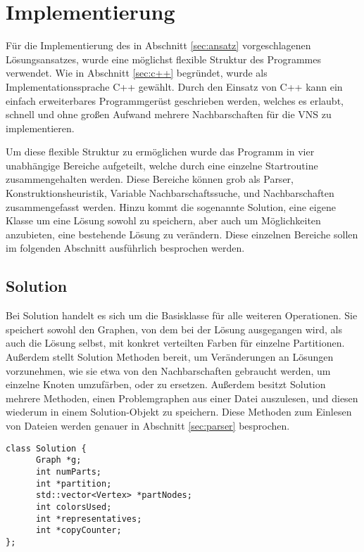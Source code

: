 \section{Implementierung}
Für die Implementierung des in Abschnitt \ref{sec:ansatz} vorgeschlagenen Lösungsansatzes, wurde eine möglichst flexible Struktur des Programmes verwendet. Wie in Abschnitt \ref{sec:c++} begründet, wurde
als Implementationssprache C++ gewählt. Durch den Einsatz von C++ kann ein einfach erweiterbares Programmgerüst geschrieben werden, welches es erlaubt, schnell und ohne großen Aufwand mehrere Nachbarschaften
für die VNS zu implementieren. 

Um diese flexible Struktur zu ermöglichen wurde das Programm in vier unabhängige Bereiche aufgeteilt, welche durch eine einzelne Startroutine zusammengehalten werden. Diese Bereiche können grob als Parser, 
Konstruktionsheuristik, Variable Nachbarschaftssuche, und Nachbarschaften zusammengefasst werden. Hinzu kommt die sogenannte Solution, eine eigene Klasse um eine Lösung sowohl zu speichern, aber auch um Möglichkeiten
anzubieten, eine bestehende Lösung zu verändern. Diese einzelnen Bereiche sollen im folgenden Abschnitt ausführlich besprochen werden.

\subsection{Solution}
Bei Solution handelt es sich um die Basisklasse für alle weiteren Operationen. Sie speichert sowohl den Graphen, von dem bei der Lösung ausgegangen wird, als auch die Lösung selbst, mit konkret verteilten Farben
für einzelne Partitionen. Außerdem stellt Solution Methoden bereit, um Veränderungen an Lösungen vorzunehmen, wie sie etwa von den Nachbarschaften gebraucht werden, um einzelne Knoten umzufärben, oder zu ersetzen.
Außerdem besitzt Solution mehrere Methoden, einen Problemgraphen aus einer Datei auszulesen, und diesen wiederum in einem Solution-Objekt zu speichern. Diese Methoden zum Einlesen von Dateien werden genauer 
in Abschnitt \ref{sec:parser} besprochen.

\singlespacing
\begin{lstlisting}[caption={Ein Ausschnitt aus der Signatur der Solutionklasse},label=lst:solution]
class Solution {
      Graph *g;
      int numParts;
      int *partition;
      std::vector<Vertex> *partNodes;
      int colorsUsed;
      int *representatives;
      int *copyCounter;
};
\end{lstlisting}


